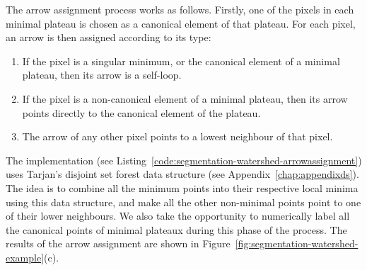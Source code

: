 The arrow assignment process works as follows. Firstly, one of the pixels in each minimal plateau is chosen as a canonical element of that plateau. For each pixel, an arrow is then assigned according to its type:
%
\begin{enumerate}
\item If the pixel is a singular minimum, or the canonical element of a minimal plateau, then its arrow is a self-loop.
\item If the pixel is a non-canonical element of a minimal plateau, then its arrow points directly to the canonical element of the plateau.
\item The arrow of any other pixel points to a lowest neighbour of that pixel.
\end{enumerate}
%
The implementation (see Listing~\ref{code:segmentation-watershed-arrowassignment}) uses Tarjan's disjoint set forest data structure (see Appendix~\ref{chap:appendixds}). The idea is to combine all the minimum points into their respective local minima using this data structure, and make all the other non-minimal points point to one of their lower neighbours. We also take the opportunity to numerically label all the canonical points of minimal plateaux during this phase of the process. The results of the arrow assignment are shown in Figure~\ref{fig:segmentation-watershed-example}(c).

